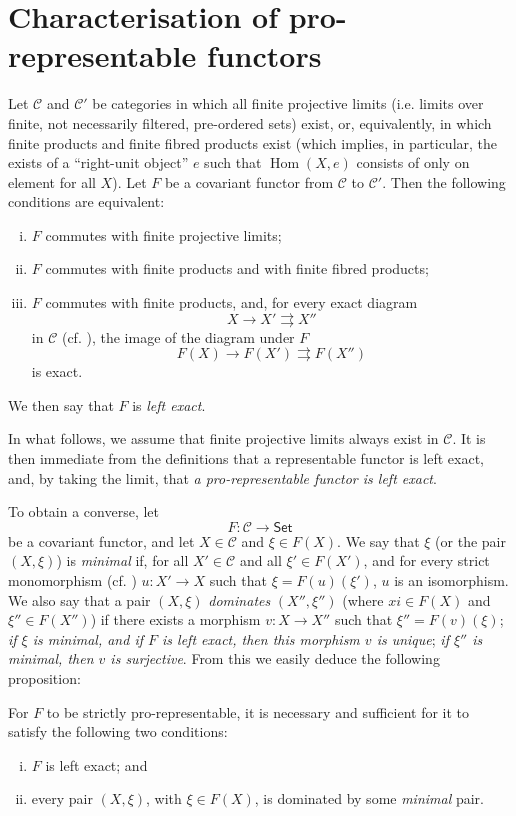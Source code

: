 \documentclass{article}
\theoremstyle{plain}
\newenvironment{proposition}[1]
  {\renewcommand\theinnercustomproposition{#1}\innercustomproposition}
  {\endinnercustomproposition}
\theoremstyle{definition}
\newcommand{\cat}[1]{{\mathcal{#1}}}
\newcommand{\Set}{\mathsf{Set}}
\DeclareMathOperator{\Hom}{Hom}
\newcommand{\oldpage}[1]{\marginpar{\footnotesize$\Big\vert$ \textit{p.~#1}}}
\begin{document}
\section{Characterisation of pro-representable functors}
\label{A.3}

Let $\cat{C}$ and $\cat{C}'$ be categories in which all finite projective limits (i.e. limits over finite, not necessarily filtered, pre-ordered sets) exist, or, equivalently, in which finite products and finite fibred products exist (which implies, in particular, the exists of a ``right-unit object'' $e$ such that $\Hom(X,e)$ consists of only on element for all $X$).
Let $F$ be a covariant functor from $\cat{C}$ to $\cat{C}'$.
Then the following conditions are equivalent:
\begin{enumerate}[i.]
  \item $F$ commutes with finite projective limits;
  \item $F$ commutes with finite products and with finite fibred products;
  \item $F$ commutes with finite products, and, for every exact diagram
    \[
      X\to X'\rightrightarrows X''
    \]
    in $\cat{C}$ (cf. \cite[A, Definition 2.1]{3}), the image of the diagram under $F$
    \[
      F(X)\to F(X')\rightrightarrows F(X'')
    \]
    is exact.
\end{enumerate}
We then say that $F$ is \emph{left exact}.

In what follows, we assume that finite projective limits always exist in $\cat{C}$.
It is then immediate from the definitions that a representable functor is left exact, and, by taking the limit, that \emph{a pro-representable functor is left exact}.

To obtain a converse, let
\[
  F\colon \cat{C} \to \Set
\]
be a covariant functor, and let $X\in\cat{C}$ and $\xi\in F(X)$.
We say that $\xi$ (or the pair
\oldpage{195-06}
$(X,\xi)$) is \emph{minimal} if, for all $X'\in\cat{C}$ and all $\xi'\in F(X')$, and for every strict monomorphism (cf. \cite[A, \S2]{3}) $u\colon X'\to X$ such that $\xi=F(u)(\xi')$, $u$ is an isomorphism.
We also say that a pair $(X,\xi)$ \emph{dominates} $(X'',\xi'')$ (where $xi\in F(X)$ and $\xi''\in F(X'')$) if there exists a morphism $v\colon X\to X''$ such that $\xi''=F(v)(\xi)$;
\emph{if $\xi$ is minimal, and if $F$ is left exact, then this morphism $v$ is unique};
\emph{if $\xi''$ is minimal, then $v$ is surjective}.
From this we easily deduce the following proposition:

\begin{proposition}{3.1}
\label{A.3-proposition1}
  For $F$ to be strictly pro-representable, it is necessary and sufficient for it to satisfy the following two conditions:
  \begin{enumerate}[i.]
    \item $F$ is left exact; and
    \item every pair $(X,\xi)$, with $\xi\in F(X)$, is dominated by some \emph{minimal} pair.
  \end{enumerate}
\end{proposition}
\end{document}
